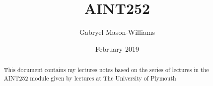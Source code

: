 \documentclass{article}
\title{AINT252}
\author{Gabryel Mason-Williams }
\date{February 2019}
\begin{document}
\def\layersep{2.5cm}
\maketitle
\begin{abstract}
    This document contains my lectures notes based on the series of lectures in the AINT252 module given by lectures at The University of Plymouth 
\end{abstract}
\newpage
\tableofcontents
\newpage

\newpage

\end{document}
